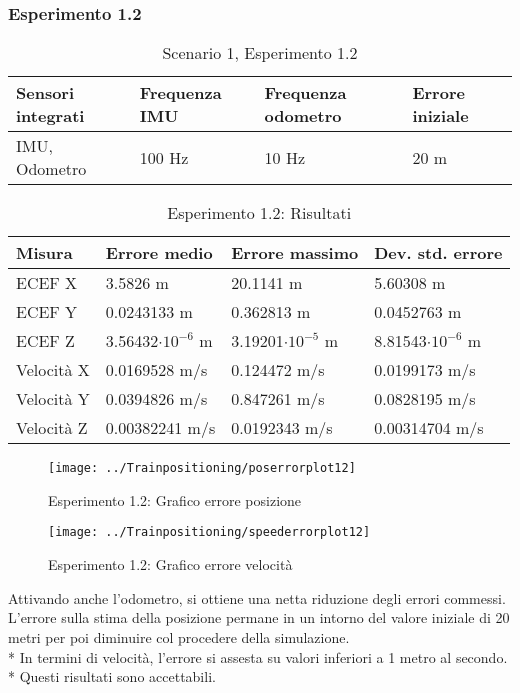 \subsubsection{Esperimento 1.2}
\begin{table}[h]
	\centering
	\begin{tabular}{|p{3cm}|p{2.75cm}|p{2.75cm}|p{2.75cm}|}
	\hline 
	\textbf{Sensori integrati} & \textbf{Frequenza IMU}  & \textbf{Frequenza odometro} & \textbf{Errore iniziale} \\ 
	\hline 
		IMU, Odometro & 100 Hz & 10 Hz & 20 m\\ 
		\hline 
	\end{tabular}
	\caption{Scenario 1, Esperimento 1.2}
	\label{tab:exp12}
\end{table}
\begin{table}[h]
	\centering
	\begin{tabular}{|p{2cm}|p{3cm}|p{3cm}|p{3cm}|}
		\hline 
		\textbf{Misura} & \textbf{Errore medio}  & \textbf{Errore massimo} & \textbf{Dev. std. errore}\\ 
		\hline 
		ECEF X & 3.5826 m & 20.1141 m & 5.60308 m \\ 
		\hline 
		ECEF Y & 0.0243133 m & 0.362813 m & 0.0452763 m \\ 
		\hline 
		ECEF Z & 3.56432$\cdot10^{-6}$ m & 3.19201$\cdot10^{-5}$ m & 8.81543$\cdot10^{-6}$ m \\ 
		\hline 
		Velocit\`a X & 0.0169528 m/s & 0.124472 m/s & 0.0199173 m/s \\ 
		\hline 
		Velocit\`a Y & 0.0394826 m/s & 0.847261 m/s & 0.0828195 m/s \\ 
		\hline 
		Velocit\`a Z & 0.00382241 m/s & 0.0192343 m/s & 0.00314704 m/s \\ 
		\hline 
	\end{tabular}
	\caption{Esperimento 1.2: Risultati}
	\label{tab:exp12res}
\end{table}
\begin{figure}[h]
	\centering
	\texttt{[image: ../Trainpositioning/poserrorplot12]}
	\caption{Esperimento 1.2: Grafico errore posizione}
	\label{fig:poserrorplot12}
\end{figure}
\FloatBarrier
\begin{figure}[h]
	\centering
	\texttt{[image: ../Trainpositioning/speederrorplot12]}
	\caption{Esperimento 1.2: Grafico errore velocit\`a}
	\label{fig:velerrorplot12}
\end{figure}
Attivando anche l'odometro, si ottiene una netta riduzione degli errori commessi. L'errore sulla stima della posizione permane in un intorno del valore iniziale di 20 metri per poi diminuire col procedere della simulazione.\\*
In termini di velocit\`a, l'errore si assesta su valori inferiori a 1 metro al secondo.\\*
Questi risultati sono accettabili.
